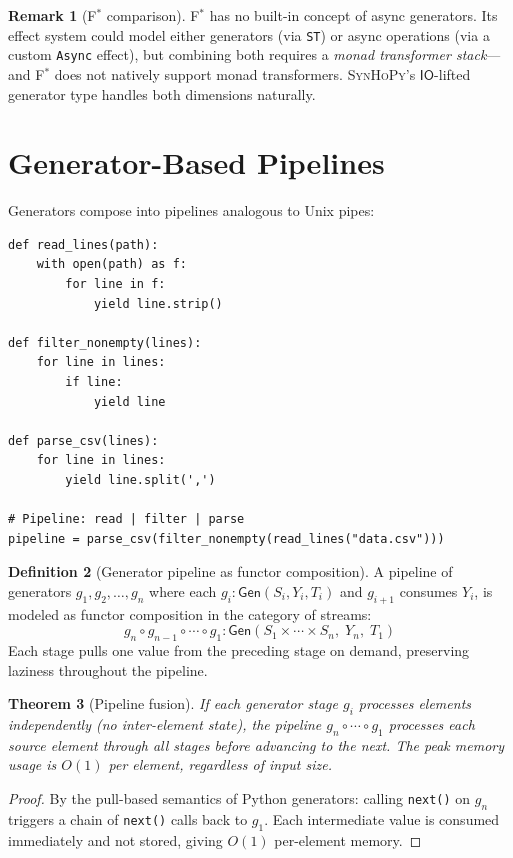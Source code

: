 \documentclass[11pt,a4paper]{report}
\theoremstyle{definition}
\newtheorem{definition}{Definition}[chapter]
\newtheorem{remark}[definition]{Remark}
\theoremstyle{plain}
\newtheorem{theorem}[definition]{Theorem}
\newcommand{\IO}{\mathsf{IO}}
\newcommand{\fstar}{F$^{*}$}
\newcommand{\synhopy}{\textsc{SynHoPy}}
\begin{document}
\begin{remark}[\fstar{} comparison]
\fstar{} has no built-in concept of async generators.  Its effect system
could model either generators (via \lstinline[style=fstar]|ST|) or async
operations (via a custom \lstinline[style=fstar]|Async| effect), but combining
both requires a \emph{monad transformer stack}---and \fstar{} does not
natively support monad transformers.
\synhopy{}'s $\IO$-lifted generator type handles both dimensions naturally.
\end{remark}

\section{Generator-Based Pipelines}

Generators compose into pipelines analogous to Unix pipes:

\begin{lstlisting}[style=python]
def read_lines(path):
    with open(path) as f:
        for line in f:
            yield line.strip()

def filter_nonempty(lines):
    for line in lines:
        if line:
            yield line

def parse_csv(lines):
    for line in lines:
        yield line.split(',')

# Pipeline: read | filter | parse
pipeline = parse_csv(filter_nonempty(read_lines("data.csv")))
\end{lstlisting}

\begin{definition}[Generator pipeline as functor composition]
A pipeline of generators $g_1, g_2, \ldots, g_n$ where each $g_i : \mathsf{Gen}(S_i, Y_i, T_i)$
and $g_{i+1}$ consumes $Y_i$, is modeled as functor composition in the
category of streams:
\[
  g_n \circ g_{n-1} \circ \cdots \circ g_1 :
  \mathsf{Gen}(S_1 \times \cdots \times S_n,\; Y_n,\; T_1)
\]
Each stage pulls one value from the preceding stage on demand, preserving
laziness throughout the pipeline.
\end{definition}

\begin{theorem}[Pipeline fusion]
If each generator stage $g_i$ processes elements independently (no
inter-element state), the pipeline $g_n \circ \cdots \circ g_1$ processes
each source element through all stages before advancing to the next.
The peak memory usage is $O(1)$ per element, regardless of input size.
\end{theorem}
\begin{proof}
By the pull-based semantics of Python generators: calling
\texttt{next()} on $g_n$ triggers a chain of \texttt{next()} calls
back to $g_1$.  Each intermediate value is consumed immediately and
not stored, giving $O(1)$ per-element memory.
\end{proof}
\end{document}
